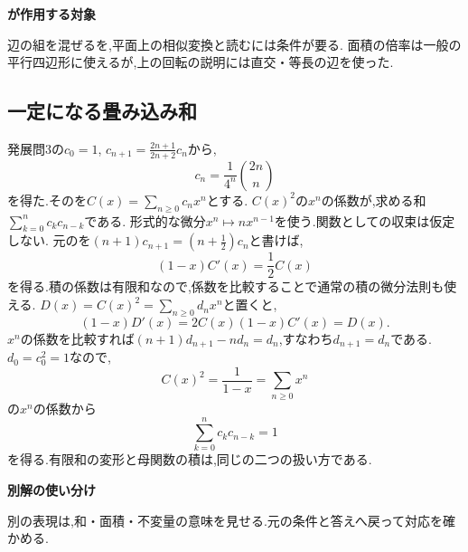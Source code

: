   \begin{bookpoint}
    \textbf{が作用する対象}\par
    辺の組を混ぜるを,平面上の相似変換と読むには条件が要る.
    面積の倍率は一般の平行四辺形に使えるが,上の回転の説明には直交・等長の辺を使った.
  \end{bookpoint}

  \subsection{一定になる畳み込み和}
  発展問3の$c_0=1$, $c_{n+1}=\frac{2n+1}{2n+2}c_n$から,
  \[
    c_n=\frac1{4^n}\binom{2n}{n}
  \]
  を得た.そのを$C(x)=\sum_{n\ge0}c_nx^n$とする.
  $C(x)^2$の$x^n$の係数が,求める和$\sum_{k=0}^n c_kc_{n-k}$である.
  形式的な微分$x^n\mapsto nx^{n-1}$を使う.関数としての収束は仮定しない.
  元のを$(n+1)c_{n+1}=(n+\frac12)c_n$と書けば,
  \[
    (1-x)C'(x)=\frac12C(x)
  \]
  を得る.積の係数は有限和なので,係数を比較することで通常の積の微分法則も使える.
  $D(x)=C(x)^2=\sum_{n\ge0}d_nx^n$と置くと,
  \[
    (1-x)D'(x)=2C(x)(1-x)C'(x)=D(x).
  \]
  $x^n$の係数を比較すれば$(n+1)d_{n+1}-nd_n=d_n$,すなわち$d_{n+1}=d_n$である.
  $d_0=c_0^2=1$なので,
  \[
    C(x)^2=\frac1{1-x}=\sum_{n\ge0}x^n
  \]
  の$x^n$の係数から
  \[
    \sum_{k=0}^n c_kc_{n-k}=1
  \]
  を得る.有限和の変形と母関数の積は,同じの二つの扱い方である.

  \begin{bookpoint}
    \textbf{別解の使い分け}\par
    別の表現は,和・面積・不変量の意味を見せる.元の条件と答えへ戻って対応を確かめる.
  \end{bookpoint}
